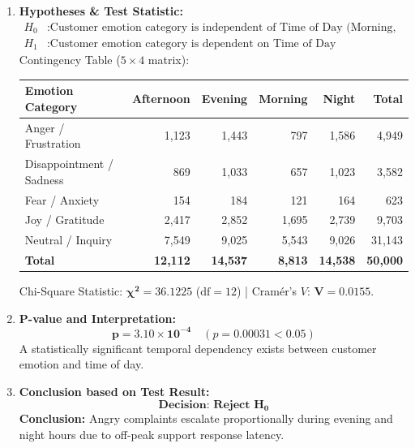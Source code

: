 \documentclass[11pt, a4paper]{article}
\begin{document}
\begin{enumerate}[leftmargin=1.5em]
    \item \textbf{Hypotheses \& Test Statistic:}
    \begin{align*}
        H_0 &: \text{Customer emotion category is independent of Time of Day (Morning, Afternoon, Evening, Night)} \\
        H_1 &: \text{Customer emotion category is dependent on Time of Day}
    \end{align*}
    Contingency Table ($5 \times 4$ matrix):
    \begin{table}[H]
    \centering
    \small
    \begin{tabular}{lrrrrr}
    \toprule
    \textbf{Emotion Category} & \textbf{Afternoon} & \textbf{Evening} & \textbf{Morning} & \textbf{Night} & \textbf{Total} \\
    \midrule
    Anger / Frustration      & 1,123 & 1,443 & 797   & 1,586 & 4,949 \\
    Disappointment / Sadness & 869   & 1,033 & 657   & 1,023 & 3,582 \\
    Fear / Anxiety           & 154   & 184   & 121   & 164   & 623 \\
    Joy / Gratitude          & 2,417 & 2,852 & 1,695 & 2,739 & 9,703 \\
    Neutral / Inquiry        & 7,549 & 9,025 & 5,543 & 9,026 & 31,143 \\
    \midrule
    \textbf{Total}           & \textbf{12,112} & \textbf{14,537} & \textbf{8,813} & \textbf{14,538} & \textbf{50,000} \\
    \bottomrule
    \end{tabular}
    \end{table}
    Chi-Square Statistic: $\mathbf{\chi^2 = 36.1225}$ ($\text{df} = 12$) \quad | \quad Cram\'er's $V$: $\mathbf{V = 0.0155}$.
    
    \item \textbf{P-value and Interpretation:}
    $$\mathbf{p = 3.10 \times 10^{-4}} \quad (p = 0.00031 < 0.05)$$
    A statistically significant temporal dependency exists between customer emotion and time of day.
    
    \item \textbf{Conclusion based on Test Result:}
    $$\mathbf{\text{Decision: Reject } H_0}$$
    \textbf{Conclusion:} Angry complaints escalate proportionally during evening and night hours due to off-peak support response latency.
\end{enumerate}
\end{document}

